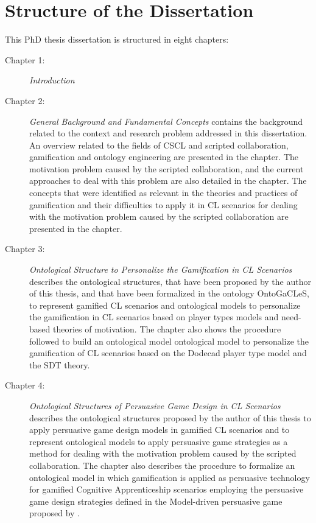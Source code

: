 \section{Structure of the Dissertation}
\label{sec:structure-of-dissertation}

This PhD thesis dissertation is structured in eight chapters:

\begin{description}

\item[Chapter 1:]
\emph{Introduction}

\item[Chapter 2:]
\emph{General Background and Fundamental Concepts}
contains the background related to the context and research problem addressed in this dissertation. An overview related to the fields of CSCL and scripted collaboration, gamification and ontology engineering are presented in the chapter. The motivation problem caused by the scripted collaboration, and the current approaches to deal with this problem are also detailed in the chapter. The concepts that were identified as relevant in the theories and practices of gamification and their difficulties to apply it in CL scenarios for dealing with the motivation problem caused by the scripted collaboration are presented in the chapter.

\item[Chapter 3:]
\emph{Ontological Structure to Personalize the Gamification in CL Scenarios} describes the ontological structures, that have been proposed by the author of this thesis, and that have been formalized in the ontology OntoGaCLeS, to represent gamified CL scenarios and ontological models to personalize the gamification in CL scenarios based on player types models and need-based theories of motivation. The chapter also shows the procedure followed to build an ontological model ontological model to personalize the gamification of CL scenarios based on the Dodecad player type model and the SDT theory. 

\item[Chapter 4:]
\emph{Ontological Structures of Persuasive Game Design in CL Scenarios} describes the ontological structures proposed by the author of this thesis to apply persuasive game design models in gamified CL scenarios and to represent ontological models to apply persuasive game strategies as a method for dealing with the motivation problem caused by the scripted collaboration. The chapter also describes the procedure to formalize an ontological model in which gamification is applied as persuasive technology for gamified Cognitive Apprenticeship scenarios employing the persuasive game design strategies defined in the Model-driven persuasive game proposed by .


\end{description}
